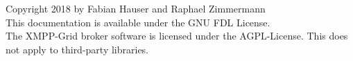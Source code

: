 \vspace*{\fill}

\noindent \textcopyright  Copyright 2018 by Fabian Hauser and Raphael Zimmermann\\

\noindent This documentation is available under the GNU FDL License. \\

\noindent The XMPP-Grid broker software is licensed under the AGPL-License. This does not apply to third-party libraries.

\pagebreak





